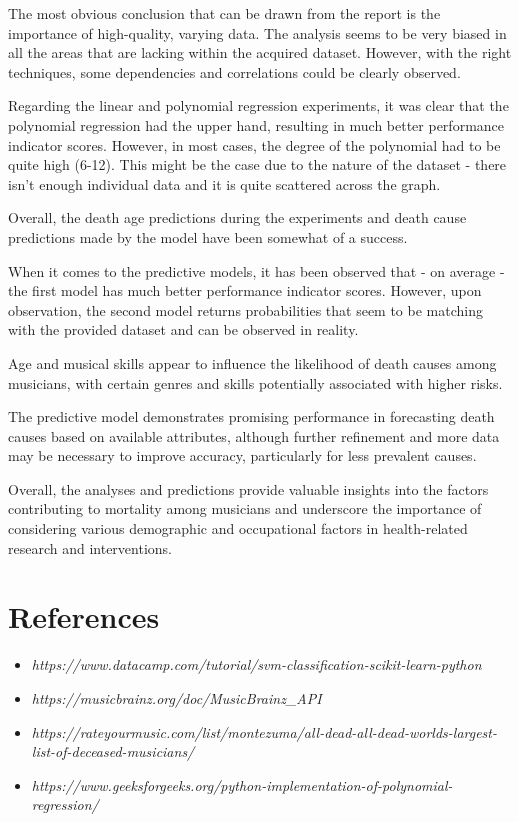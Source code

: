 \documentclass{article}
\begin{document}
The most obvious conclusion that can be drawn from the report is the importance of high-quality, varying data. The analysis seems to be very biased in all the areas that are lacking within the acquired dataset. However, with the right techniques, some dependencies and correlations could be clearly observed.

Regarding the linear and polynomial regression experiments, it was clear that the polynomial regression had the upper hand, resulting in much better performance indicator scores. However, in most cases, the degree of the polynomial had to be quite high (6-12). This might be the case due to the nature of the dataset - there isn't enough individual data and it is quite scattered across the graph.

Overall, the death age predictions during the experiments and death cause predictions made by the model have been somewhat of a success. 

When it comes to the predictive models, it has been observed that - on average - the first model has much better performance indicator scores. However, upon observation, the second model returns probabilities that seem to be matching with the provided dataset and can be observed in reality.

Age and musical skills appear to influence the likelihood of death causes among musicians, with certain genres and skills potentially associated with higher risks.

The predictive model demonstrates promising performance in forecasting death causes based on available attributes, although further refinement and more data may be necessary to improve accuracy, particularly for less prevalent causes.

Overall, the analyses and predictions provide valuable insights into the factors contributing to mortality among musicians and underscore the importance of considering various demographic and occupational factors in health-related research and interventions.


\section{References}

\begin{itemize}
    \item \textit{https://www.datacamp.com/tutorial/svm-classification-scikit-learn-python}
    \item \textit{https://musicbrainz.org/doc/MusicBrainz\_API}
    \item \textit{https://rateyourmusic.com/list/montezuma/all-dead-all-dead-worlds-largest-list-of-deceased-musicians/}
    \item \textit{https://www.geeksforgeeks.org/python-implementation-of-polynomial-regression/}
\end{itemize}
\end{document}
